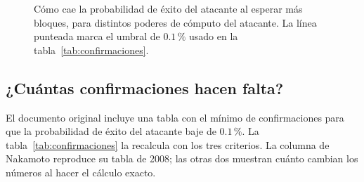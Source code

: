\documentclass[11pt,a4paper]{article}
\newcommand{\webhint}[1]{}
\newcommand{\fuentedatos}[1]{\par\smallskip{\footnotesize\textit{Datos:}~\texttt{\detokenize{#1}}}}
\begin{document}
\begin{figure}[tbp]
\centering
\webhint{figure; id=fig-ds-familia; chart=line; yscale=log; data=data/double_spend_curves.csv; filter=q in {0.10,0.20,0.30,0.40}; x=z; y=exacta_superar; reference_line=0.001; alt=Cuatro curvas logarítmicas de la probabilidad exacta de éxito del atacante según las confirmaciones, para q de 10, 20, 30 y 40 por ciento. Cuanto mayor es q, más lentamente decrece.}
\caption{Cómo cae la probabilidad de éxito del atacante al esperar más bloques, para distintos poderes de cómputo del atacante. La línea punteada marca el umbral de $0.1\,\%$ usado en la tabla~\ref{tab:confirmaciones}.}\label{fig:ds-familia}
\fuentedatos{data/double_spend_curves.csv}
\end{figure}

\subsection{¿Cuántas confirmaciones hacen falta?}

El documento original incluye una tabla con el mínimo de confirmaciones para que la probabilidad de éxito del atacante baje de $0.1\,\%$. La tabla~\ref{tab:confirmaciones} la recalcula con los tres criterios. La columna de Nakamoto reproduce su tabla de 2008; las otras dos muestran cuánto cambian los números al hacer el cálculo exacto.
\end{document}
